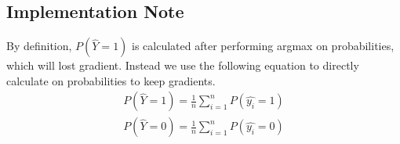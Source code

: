 \documentclass{article}
\begin{document}
\subsection{Implementation Note}
By definition, $P(\hat{Y} = 1)$ is calculated after performing argmax on probabilities, which will lost gradient. Instead we use the following equation to directly calculate on probabilities to keep gradients.
\begin{equation}\begin{split}\label{eq:assumption1}
P(\hat{Y}=1) = \frac{1}{n}\sum_{i=1}^n P(\hat{y_i} = 1)\\
P(\hat{Y}=0) = \frac{1}{n}\sum_{i=1}^n P(\hat{y_i} = 0)
\end{split}\end{equation}
\end{document}
